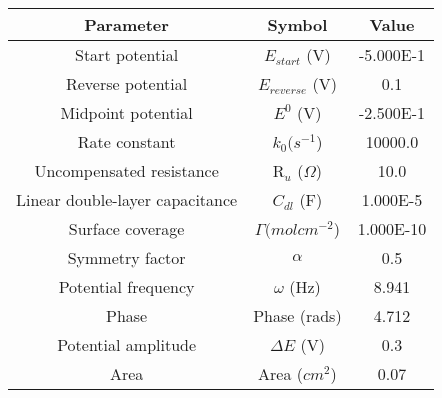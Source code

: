 \documentclass[preview]{standalone}
\begin{document}
\begin{center}
\begin{tabular}{|c|c|c|}
\hline
Parameter & Symbol& Value\\
\hline\hline
Start potential & $E_{start}$ (V) & -5.000E-1 \\
\hline
Reverse potential & $E_{reverse}$ (V) & 0.1 \\
\hline
Midpoint potential & $E^0$ (V) & -2.500E-1 \\
\hline
Rate constant & $k_0 (s^{-1}$) & 10000.0 \\
\hline
Uncompensated resistance & R$_u$ ($\Omega$) & 10.0 \\
\hline
Linear double-layer capacitance & $C_{dl}$ (F) & 1.000E-5 \\
\hline
Surface coverage & $\Gamma (mol cm^{-2}$) & 1.000E-10 \\
\hline
Symmetry factor & $\alpha$& 0.5 \\
\hline
Potential frequency & $\omega$ (Hz) & 8.941 \\
\hline
Phase & Phase (rads) & 4.712 \\
\hline
Potential amplitude & $\Delta E$ (V) & 0.3 \\
\hline
Area & Area ($cm^{2}$) & 0.07 \\
\hline
\end{tabular}
\end{center}
\end{document}
